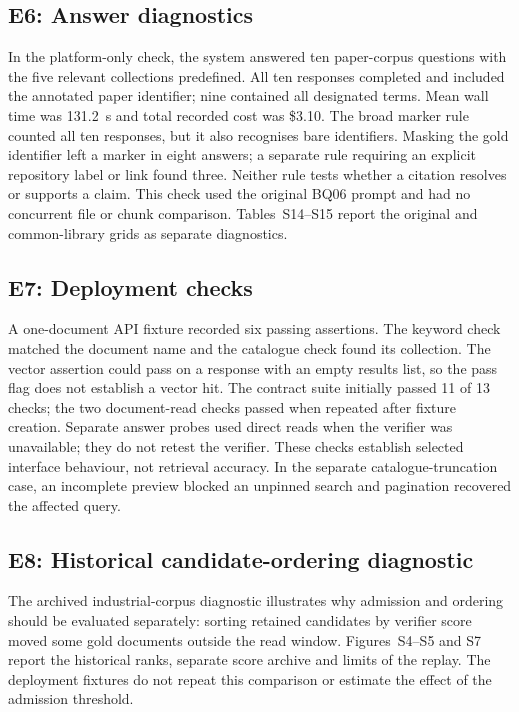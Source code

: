 \subsection{E6: Answer diagnostics}
\label{sec:e5}
\label{sec:agentic}\label{sec:abstention}\label{sec:composition}\label{sec:eval-agent}
In the platform-only check, the system answered ten paper-corpus questions
with the five relevant collections predefined. All ten responses completed
and included the annotated paper identifier; nine contained all designated
terms. Mean wall time was 131.2~s and total recorded cost was \$3.10. The
broad marker rule counted all ten responses, but it also recognises bare
identifiers. Masking the gold identifier left a marker in eight answers;
a separate rule requiring an explicit repository label or link found three.
Neither rule tests whether a citation resolves or supports a claim. This
check used the original BQ06 prompt and had no concurrent file or chunk
comparison. Tables~S14--S15 report the original and common-library grids
as separate diagnostics.

\subsection{E7: Deployment checks}
\label{sec:sysarms}
A one-document API fixture recorded six passing assertions.
The keyword check matched the document name and the catalogue check found
its collection. The vector assertion could pass on a response with an empty
results list, so the pass flag does not establish a vector hit. The contract
suite initially passed 11 of 13 checks; the two document-read checks passed
when repeated after fixture creation. Separate answer probes used direct
reads when the verifier was unavailable; they do not retest the verifier.
These checks establish selected interface behaviour, not retrieval accuracy.
In the separate catalogue-truncation case, an incomplete preview blocked
an unpinned search and pagination recovered the affected query.

\subsection{E8: Historical candidate-ordering diagnostic}
\label{sec:e6}
\label{sec:inflation}\label{sec:eval-verify}
The archived industrial-corpus diagnostic illustrates why admission and
ordering should be evaluated separately: sorting retained candidates by
verifier score moved some gold documents outside the read window.
Figures~S4--S5 and S7 report the historical ranks, separate score archive
and limits of the replay. The deployment fixtures do not repeat this
comparison or estimate the effect of the admission threshold.

